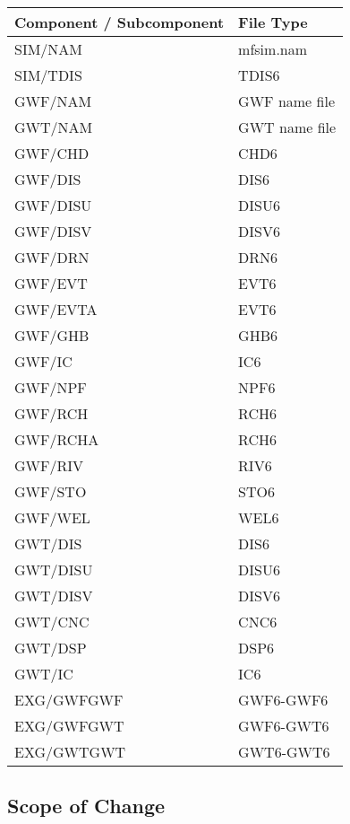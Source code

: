 \begin{table}[H]
\caption{Components and subcomponents that are read using Input Data Processor (IDP) routines}
\small
\begin{center}
\begin{longtable}{p{6cm} p{4cm}}
\hline
\hline
\textbf{Component / Subcomponent} & \textbf{File Type} \\
\hline
SIM/NAM & mfsim.nam \\
SIM/TDIS & TDIS6 \\
GWF/NAM & GWF name file \\
GWT/NAM & GWT name file \\
GWF/CHD & CHD6 \\
GWF/DIS & DIS6 \\
GWF/DISU & DISU6 \\
GWF/DISV & DISV6 \\
GWF/DRN & DRN6 \\
GWF/EVT & EVT6 \\
GWF/EVTA & EVT6 \\
GWF/GHB & GHB6 \\
GWF/IC & IC6 \\
GWF/NPF & NPF6 \\
GWF/RCH & RCH6 \\
GWF/RCHA & RCH6 \\
GWF/RIV & RIV6 \\
GWF/STO & STO6 \\
GWF/WEL & WEL6 \\
GWT/DIS & DIS6 \\
GWT/DISU & DISU6 \\
GWT/DISV & DISV6 \\
GWT/CNC & CNC6 \\
GWT/DSP & DSP6 \\
GWT/IC & IC6 \\
EXG/GWFGWF & GWF6-GWF6 \\
EXG/GWFGWT & GWF6-GWT6 \\
EXG/GWTGWT & GWT6-GWT6 \\
\hline
\end{longtable}
\label{table:idmsupported}
\end{center}
\normalsize
\end{table}

\subsection{Scope of Change}

